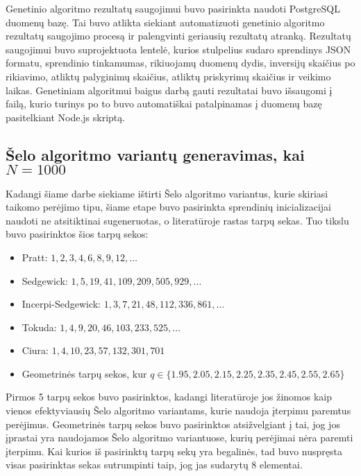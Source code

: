 \documentclass{VUMIFInfKursinis}
\begin{document}
Genetinio algoritmo rezultatų saugojimui buvo pasirinkta naudoti PostgreSQL duomenų bazę.
Tai buvo atlikta siekiant automatizuoti genetinio algoritmo rezultatų saugojimo procesą ir palengvinti geriausių rezultatų atranką.
Rezultatų saugojimui buvo suprojektuota lentelė, kurios stulpelius sudaro sprendinys JSON formatu, sprendinio tinkamumas, rikiuojamų duomenų dydis,
inversijų skaičius po rikiavimo, atliktų palyginimų skaičius, atliktų priskyrimų skaičius ir veikimo laikas.  
Genetiniam algoritmui baigus darbą gauti rezultatai buvo išsaugomi į failą, kurio turinys po to buvo automatiškai patalpinamas į duomenų bazę pasitelkiant Node.js skriptą.

\subsection{Šelo algoritmo variantų generavimas, kai $N = 1000$}

Kadangi šiame darbe siekiame ištirti Šelo algoritmo variantus, kurie skiriasi taikomo perėjimo tipu,
šiame etape buvo pasirinkta sprendinių inicializacijai naudoti ne atsitiktinai sugeneruotas, o literatūroje rastas tarpų sekas.
Tuo tikslu buvo pasirinktos šios tarpų sekos:
\begin{itemize}
  \item Pratt: $1, 2, 3, 4, 6, 8, 9, 12, \ldots$ \cite{pratt1972shellsort}
  \item Sedgewick: $1, 5, 19, 41, 109, 209, 505, 929, \ldots$ \cite{SEDGEWICK1986159}
  \item Incerpi-Sedgewick: $1, 3, 7, 21, 48, 112, 336, 861, \ldots$ \cite{incerpi1985improved}
  \item Tokuda: $1, 4, 9, 20, 46, 103, 233, 525, \ldots $ \cite{10.5555/645569.659879}
  \item Ciura: $1, 4, 10, 23, 57, 132, 301, 701$ \cite{ciura2001best}
  \item Geometrinės tarpų sekos, kur $ q \in \{1.95, 2.05, 2.15, 2.25, 2.35, 2.45, 2.55, 2.65 \}$ \cite{Radavičius_Baranauskas_2013}
\end{itemize}
Pirmos 5 tarpų sekos buvo pasirinktos, kadangi literatūroje jos žinomos kaip vienos efektyviausių
Šelo algoritmo variantams, kurie naudoja įterpimu paremtus perėjimus.
Geometrinės tarpų sekos buvo pasirinktos atsižvelgiant į tai, jog jos įprastai yra naudojamos
Šelo algoritmo variantuose, kurių perėjimai nėra paremti įterpimu.
Kai kurios iš pasirinktų tarpų sekų yra begalinės, tad buvo nuspręsta visas pasirinktas sekas sutrumpinti taip, jog jas sudarytų 8 elementai.
\end{document}
